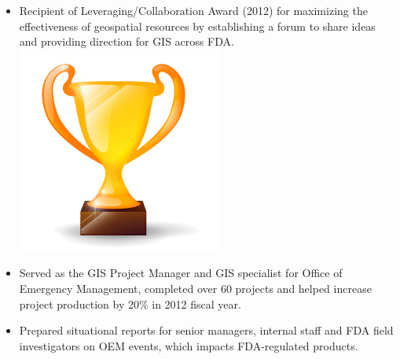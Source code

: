\documentclass[letterpaper]{twentysecondcv} %
\begin{document}
\begin{twenty}
{{\begin{itemize}
\item	Recipient of Leveraging/Collaboration Award (2012) for maximizing the effectiveness of geospatial resources by establishing a forum to share ideas and providing direction for GIS across FDA.	\includegraphics[scale=0.05]{img/trophy.png}
\vspace{1mm}
\item	Served as the GIS Project Manager and GIS specialist for Office of Emergency Management, completed over 60 projects and helped increase project production by 20\% in 2012 fiscal year. 
\vspace{1mm}
\item	Prepared situational reports for senior managers, internal staff and FDA field investigators on OEM events, which impacts FDA-regulated products. 
\vspace{1mm}


\end{itemize}}}
\end{twenty}
\end{document}
